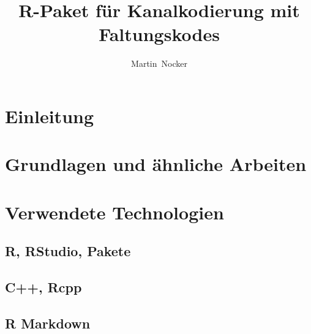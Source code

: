 \documentclass[germanthesis]{thesis-style}
\author{Martin~Nocker}
\title{R-Paket für Kanalkodierung mit Faltungskodes}
\begin{document}
\maketitle

\begin{abstract}

\end{abstract}
%

\tableofcontents
{}

\chapter{Einleitung}
\label{chapter:einleitung}


\chapter{Grundlagen und ähnliche Arbeiten}
\label{chapter:grundlagen}

\chapter{Verwendete Technologien}
\label{chapter:technologien}
\section{R, RStudio, Pakete}
\section{C++, Rcpp}
\section{R Markdown}
\end{document}
